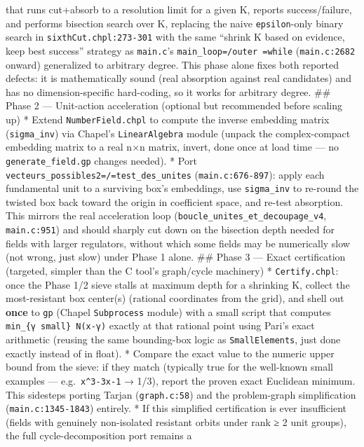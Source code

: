 \documentclass[11pt]{article}
\begin{document}
that runs cut+absorb to a resolution limit for a given K, reports
success/failure, and performs bisection search over K, replacing the
naive \texttt{epsilon}-only binary search in \texttt{sixthCut.chpl:273-301} with the
same “shrink K based on evidence, keep best success” strategy as
\texttt{main.c}'s \texttt{main\_loop=/outer =while} (\texttt{main.c:2682} onward) generalized
to arbitrary degree. This phase alone fixes both reported defects: it is
mathematically sound (real absorption against real candidates) and has
no dimension-specific hard-coding, so it works for arbitrary degree. \#\#
Phase 2 --- Unit-action acceleration (optional but recommended before
scaling up) * Extend \texttt{NumberField.chpl} to compute the inverse embedding
matrix (\texttt{sigma\_inv}) via Chapel's \texttt{LinearAlgebra} module (unpack the
complex-compact embedding matrix to a real n×n matrix, invert, done once
at load time --- no \texttt{generate\_field.gp} changes needed). * Port
\texttt{vecteurs\_possibles2=/=test\_des\_unites} (\texttt{main.c:676-897}): apply each
fundamental unit to a surviving box's embeddings, use \texttt{sigma\_inv} to
re-round the twisted box back toward the origin in coefficient space,
and re-test absorption. This mirrors the real acceleration loop
(\texttt{boucle\_unites\_et\_decoupage\_v4}, \texttt{main.c:951}) and should sharply cut
down on the bisection depth needed for fields with larger regulators,
without which some fields may be numerically slow (not wrong, just slow)
under Phase 1 alone. \#\# Phase 3 --- Exact certification (targeted,
simpler than the C tool's graph/cycle machinery) * \texttt{Certify.chpl}: once
the Phase 1/2 sieve stalls at maximum depth for a shrinking K, collect
the most-resistant box center(s) (rational coordinates from the grid),
and shell out \textbf{once} to \texttt{gp} (Chapel \texttt{Subprocess} module) with a small
script that computes \texttt{min\_\{γ small\} N(x-γ)} exactly at that rational
point using Pari's exact arithmetic (reusing the same bounding-box logic
as \texttt{SmallElements}, just done exactly instead of in float). * Compare
the exact value to the numeric upper bound from the sieve: if they match
(typically true for the well-known small examples --- e.g. \texttt{x\textasciicircum{}3-3x-1} →
1/3), report the proven exact Euclidean minimum. This sidesteps porting
Tarjan (\texttt{graph.c:58}) and the problem-graph simplification
(\texttt{main.c:1345-1843}) entirely. * If this simplified certification is
ever insufficient (fields with genuinely non-isolated resistant orbits
under rank ≥ 2 unit groups), the full cycle-decomposition port remains a
\end{document}

